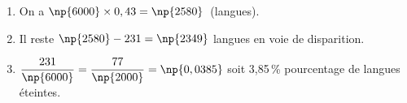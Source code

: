 
\medskip

%

\begin{enumerate}
\item %

On a $\np{6000} \times 0,43 = \np{2580}$~(langues).
\item %
Il reste $\np{2580} - 231 = \np{2349}$ langues  en voie de disparition.
\item %
$\dfrac{231}{\np{6000}} = \dfrac{77}{\np{2000}} = \np{0,0385}$ soit 3,85\,\% pourcentage de langues éteintes.
\end{enumerate} 

\vspace{0,5cm}

